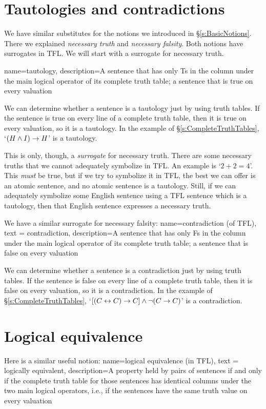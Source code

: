 \section{Tautologies and contradictions}
We have similar substitutes for the notions we introduced in \S\ref{s:BasicNotions}. There we explained \emph{necessary truth} and \emph{necessary falsity}. Both notions have surrogates in TFL. We will start with a surrogate for necessary truth.

{
name=tautology,
description={A sentence that has only Ts in the column under the main logical operator of its \gls{complete truth table}; a sentence that is true on every \gls{valuation}}
}

We can determine whether a sentence is a tautology just by using truth tables. If the sentence is true on every line of a complete truth table, then it is true on every valuation, so it is a tautology. In the example of \S\ref{s:CompleteTruthTables}, `$(H \wedge I) \rightarrow H$' is a tautology. 

This is only, though, a \emph{surrogate} for necessary truth. There are some necessary truths that we cannot adequately symbolize in TFL. An example is `$2 + 2 = 4$'. This \emph{must} be true, but if we try to symbolize it in TFL, the best we can offer is an atomic sentence, and no atomic sentence is a tautology. Still, if we can adequately symbolize some English sentence using a TFL sentence which is a tautology, then that English sentence expresses a necessary truth.

We have a similar surrogate for necessary falsity:
{
  name=contradiction (of TFL),
  text = contradiction,
description={A sentence that has only Fs in the column under the main logical operator of its \gls{complete truth table}; a sentence that is false on every \gls{valuation}}
}

We can determine whether a sentence is a contradiction just by using truth tables. If the sentence is false on every line of a complete truth table, then it is false on every valuation, so it is a contradiction. In the example of \S\ref{s:CompleteTruthTables}, `$[(C\leftrightarrow C) \rightarrow C] \wedge \neg(C \rightarrow C)$' is a contradiction.


\section{Logical equivalence}
Here is a similar useful notion:
{
  name=logical equivalence (in TFL),
  text = logically equivalent,
description={A property held by pairs of sentences if and only if the \gls{complete truth table} for those sentences has identical columns under the two main logical operators, i.e., if the sentences have the same truth value on every valuation}
}

